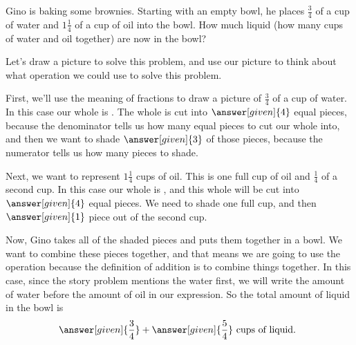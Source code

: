\documentclass{ximera}
\begin{document}
\begin{question}
Gino is baking some brownies. Starting with an empty bowl, he places $\frac{3}{4}$ of a cup of water and $1 \frac{1}{4}$ of a cup of oil into the bowl. How much liquid (how many cups of water and oil together) are now in the bowl?

\begin{explanation}
Let's draw a picture to solve this problem, and use our picture to think about what operation we could use to solve this problem.

First, we'll use the meaning of fractions to draw a picture of $\frac{3}{4}$ of a cup of water. In this case our whole is . The whole is cut into $\answer[given]{4}$ equal pieces, because the denominator tells us how many equal pieces to cut our whole into, and then we want to shade $\answer[given]{3}$ of those pieces, because the numerator tells us how many pieces to shade.

\begin{image}
\end{image}

Next, we want to represent $1 \frac{1}{4}$ cups of oil. This is one full cup of oil and $\frac{1}{4}$ of a second cup. In this case our whole is , and this whole will be cut into $\answer[given]{4}$ equal pieces. We need to shade one full cup, and then $\answer[given]{1}$ piece out of the second cup.

\begin{image}
\end{image}

Now, Gino takes all of the shaded pieces and puts them together in a bowl. We want to combine these pieces together, and that means we are going to use the operation  because the definition of addition is to combine things together. In this case, since the story problem mentions the water first, we will write the amount of water before the amount of oil in our expression. So the total amount of liquid in the bowl is
\[
\answer[given]{\frac{3}{4}} + \answer[given]{\frac{5}{4}} \textrm{ cups of liquid. }
\]


\end{explanation}
\end{question}
\end{document}
